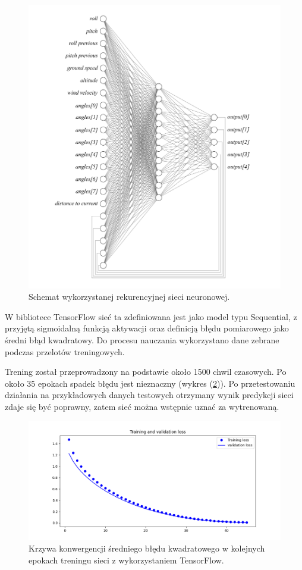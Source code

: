 \documentclass[12pt, a4paper]{article}
\let\oldref\ref
\renewcommand{\ref}[1]{(\oldref{#1})}
\begin{document}
 \begin{figure}[H]
    \centering
    \includegraphics[width=1\textwidth]{siec}
    \caption{Schemat wykorzystanej rekurencyjnej sieci neuronowej.}
    \label{fig:siec}
\end{figure}

W bibliotece TensorFlow sieć ta zdefiniowana jest jako model typu Sequential, z przyjętą sigmoidalną funkcją aktywacji oraz definicją błędu pomiarowego jako średni błąd kwadratowy. Do procesu nauczania wykorzystano dane zebrane podczas przelotów treningowych.

Trening został przeprowadzony na podstawie około 1500 chwil czasowych. Po około 35 epokach spadek błędu jest nieznaczny (wykres \ref{fig:tren1}). Po przetestowaniu działania na przykładowych danych testowych otrzymany wynik predykcji sieci zdaje się być poprawny, zatem sieć można wstępnie uznać za wytrenowaną.

 \begin{figure}[H]
    \centering
    \includegraphics[width=1\textwidth]{tfloss}
    \caption{Krzywa konwergencji średniego błędu kwadratowego w kolejnych epokach treningu sieci z wykorzystaniem TensorFlow.}
    \label{fig:tren1}
\end{figure}
\end{document}
